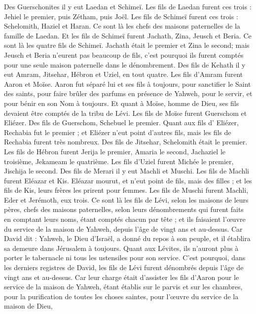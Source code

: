 \begin{multicols}{2}
Des Guerschonites il y eut Laedan et Schimeï.
Les fils de Laedan furent ces trois : Jehiel le premier, puis Zétham, puis Joël.
Les fils de Schimeï furent ces trois : Schelomith, Haziel et Haran. Ce sont là les chefs des maisons paternelles de la famille de Laedan.
Et les fils de Schimeï furent Jachath, Zina, Jeusch et Beria. Ce sont là les quatre fils de Schimeï.
Jachath était le premier et Zina le second; mais Jeusch et Beria n'eurent pas beaucoup de fils, c'est pourquoi ils furent comptés pour une seule maison paternelle dans le dénombrement.
Des fils de Kehath il y eut Amram, Jitsehar, Hébron et Uziel, en tout quatre.
Les fils d’Amram furent Aaron et Moïse. Aaron fut séparé lui et ses fils à toujours, pour sanctifier le Saint des saints, pour faire brûler des parfums en présence de Yahweh, pour le servir, et pour bénir en son Nom à toujours.
Et quant à Moïse, homme de Dieu, ses fils devaient être comptés de la tribu de Lévi.
Les fils de Moïse furent Guerschom et Eliézer.
Des fils de Guerschom, Schebuel le premier.
Quant aux fils d' Eliézer, Rechabia fut le premier ; et Eliézer n'eut point d'autres fils, mais les fils de Rechabia furent très nombreux.
Des fils de Jitsehar, Schelomith était le premier.
Les fils de Hébron furent Jerija le premier, Amaria le second, Jachaziel le troisième, Jekameam le quatrième.
Les fils d’Uziel furent Michée le premier, Jischija le second.
Des fils de Merari il y eut Machli et Muschi. Les fils de Machli furent Eléazar et Kis.
Eléazar mourut, et n'eut point de fils, mais des filles ; et les fils de Kis, leurs frères les prirent pour femmes.
Les fils de Muschi furent Machli, Eder et Jerémoth, eux trois.
Ce sont là les fils de Lévi, selon les maisons de leurs pères, chefs des maisons paternelles, selon leurs dénombrements qui furent faits en comptant leurs noms, étant comptés chacun par tête ; et ils faisaient l’œuvre du service de la maison de Yahweh, depuis l'âge de vingt ans et au-dessus.
Car David dit : Yahweh, le Dieu d'Israël, a donné du repos à son peuple, et il établira sa demeure dans Jérusalem  à toujours.
Quant aux Lévites, ils n'auront plus à porter le tabernacle ni tous les ustensiles pour son service.
C'est pourquoi, dans les derniers registres de David, les fils de Lévi furent dénombrés depuis l'âge de vingt ans et au-dessus.
Car leur charge était d'assister les fils d'Aaron pour le service de la maison de Yahweh, étant établis sur le parvis et sur les chambres, pour la purification de toutes les choses saintes, pour l'œuvre du service de la maison de Dieu,

\end{multicols}
